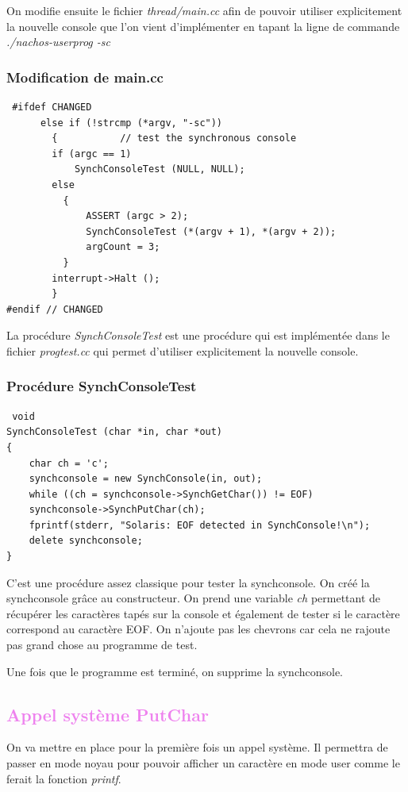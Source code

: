 \documentclass[a4paper,10pt]{report}
\begin{document}
On modifie ensuite le fichier \emph{thread/main.cc} afin de pouvoir utiliser explicitement la nouvelle console que l'on vient d'implémenter en tapant la ligne 
de commande \emph{./nachos-userprog -sc}
\textcolor{TealBlue}{\subsubsection*{Modification de main.cc}}
\begin{lstlisting}
 #ifdef CHANGED
	  else if (!strcmp (*argv, "-sc"))
	    {			// test the synchronous console
		if (argc == 1)
		    SynchConsoleTest (NULL, NULL);
		else
		  {
		      ASSERT (argc > 2);
		      SynchConsoleTest (*(argv + 1), *(argv + 2));
		      argCount = 3;
		  }
		interrupt->Halt ();
	    }
#endif // CHANGED
\end{lstlisting}
La procédure \emph{SynchConsoleTest} est une procédure qui est implémentée dans le fichier \emph{progtest.cc} qui permet d'utiliser explicitement la nouvelle
console.

\textcolor{TealBlue}{\subsubsection*{Procédure SynchConsoleTest}}
\begin{lstlisting}
 void
SynchConsoleTest (char *in, char *out)
{
    char ch = 'c';
    synchconsole = new SynchConsole(in, out);
    while ((ch = synchconsole->SynchGetChar()) != EOF)
    synchconsole->SynchPutChar(ch);
    fprintf(stderr, "Solaris: EOF detected in SynchConsole!\n");
    delete synchconsole;
}
\end{lstlisting}
C'est une procédure assez classique pour tester la synchconsole. On créé la synchconsole grâce au constructeur. On prend une variable \emph{ch} permettant
de récupérer les caractères tapés sur la console et également de tester si le caractère correspond au caractère EOF. On n'ajoute pas les chevrons car cela 
ne rajoute pas grand chose au programme de test.

Une fois que le programme est terminé, on supprime la synchconsole.
\newpage
\textcolor{Violet}{\section{Appel système PutChar}}
  On va mettre en place pour la première fois un appel système. Il permettra de passer en mode noyau pour pouvoir afficher un caractère en mode user comme le
  ferait la fonction \emph{printf}.
  
\end{document}
